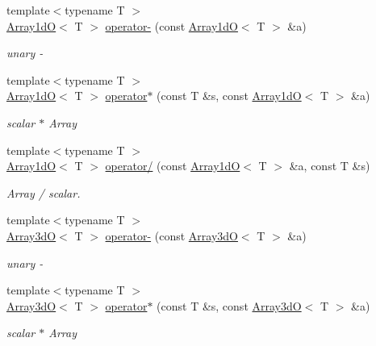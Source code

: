 \begin{DoxyCompactItemize}
\item 
{\footnotesize template$<$typename T $>$ }\\\mbox{\hyperlink{classADAT_1_1Array1dO}{Array1dO}}$<$ T $>$ \mbox{\hyperlink{namespaceADAT_a38346a215cc728771b946bbdaa59e62f}{operator-\/}} (const \mbox{\hyperlink{classADAT_1_1Array1dO}{Array1dO}}$<$ T $>$ \&a)
\begin{DoxyCompactList}\small\item\em unary -\/ \end{DoxyCompactList}\item 
{\footnotesize template$<$typename T $>$ }\\\mbox{\hyperlink{classADAT_1_1Array1dO}{Array1dO}}$<$ T $>$ \mbox{\hyperlink{namespaceADAT_af3b34c2746ded9a7804cc7f35945a02e}{operator$\ast$}} (const T \&s, const \mbox{\hyperlink{classADAT_1_1Array1dO}{Array1dO}}$<$ T $>$ \&a)
\begin{DoxyCompactList}\small\item\em scalar $\ast$ Array \end{DoxyCompactList}\item 
{\footnotesize template$<$typename T $>$ }\\\mbox{\hyperlink{classADAT_1_1Array1dO}{Array1dO}}$<$ T $>$ \mbox{\hyperlink{namespaceADAT_a32b40ea36b55f2b40457eb0c0ad63d90}{operator/}} (const \mbox{\hyperlink{classADAT_1_1Array1dO}{Array1dO}}$<$ T $>$ \&a, const T \&s)
\begin{DoxyCompactList}\small\item\em Array / scalar. \end{DoxyCompactList}\item 
{\footnotesize template$<$typename T $>$ }\\\mbox{\hyperlink{classADAT_1_1Array3dO}{Array3dO}}$<$ T $>$ \mbox{\hyperlink{namespaceADAT_a891c59cca15a986469283c3b0c8c8b9f}{operator-\/}} (const \mbox{\hyperlink{classADAT_1_1Array3dO}{Array3dO}}$<$ T $>$ \&a)
\begin{DoxyCompactList}\small\item\em unary -\/ \end{DoxyCompactList}\item 
{\footnotesize template$<$typename T $>$ }\\\mbox{\hyperlink{classADAT_1_1Array3dO}{Array3dO}}$<$ T $>$ \mbox{\hyperlink{namespaceADAT_aef364bd88d427d6a56a11f3201cbfaca}{operator$\ast$}} (const T \&s, const \mbox{\hyperlink{classADAT_1_1Array3dO}{Array3dO}}$<$ T $>$ \&a)
\begin{DoxyCompactList}\small\item\em scalar $\ast$ Array \end{DoxyCompactList}\item 

\end{DoxyCompactItemize}
